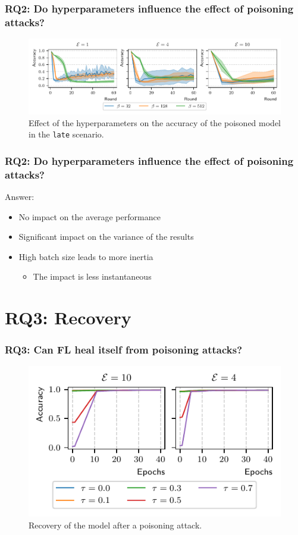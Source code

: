 \documentclass[color,t,presentation,english,aspectratio=169]{beamer}
\begin{document}
\begin{frame}
	\frametitle{RQ2: Do hyperparameters influence the effect of poisoning attacks?}

	\begin{figure}
		\centering
		\includegraphics[width=\textwidth]{figures/hyperparams-late.pdf}
		\caption{Effect of the hyperparameters on the accuracy of the poisoned model in the \texttt{late} scenario.}
	\end{figure}
\end{frame}


\begin{frame}
\frametitle{RQ2: Do hyperparameters influence the effect of poisoning attacks?}

Answer:
\begin{itemize}
	\item No impact on the average performance
	\item Significant impact on the variance of the results
	\item High batch size leads to more inertia
	\begin{itemize}
		\item The impact is less instantaneous
	\end{itemize}
\end{itemize}
\end{frame}

\section{RQ3: Recovery}

\begin{frame}
	\frametitle{RQ3: Can FL heal itself from poisoning attacks?}
	\begin{figure}
		\centering
		\includegraphics[width=.5\textwidth]{figures/redemption.pdf}
		\caption{Recovery of the model after a poisoning attack.}
	\end{figure}
\end{frame}
\end{document}
